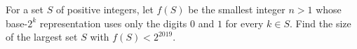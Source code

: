 For a set $S$ of positive integers, let $f(S)$ be the smallest integer $n>1$ whose base-$2^k$ representation uses only the digits $0$ and $1$ for every $k\in S$. Find the size of the largest set $S$ with $f(S)<2^{2019}$.
